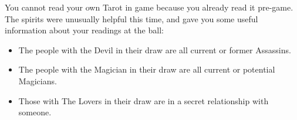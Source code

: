 \documentclass[green]{NeptuneBall}
\begin{document}
You cannot read your own Tarot in game because you already read it pre-game. The spirits were unusually helpful this time, and gave you some useful information about your readings at the ball:

\begin{itemize}
\item The people with the Devil in their draw are all current or former Assassins.
\item The people with the Magician in their draw are all current or potential Magicians.
\item Those with The Lovers in their draw are in a secret relationship with someone.
\end{itemize}
\end{document}
